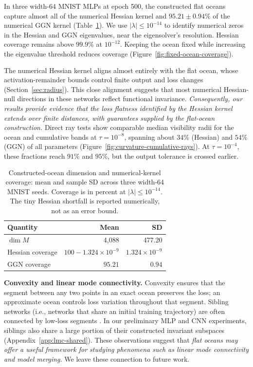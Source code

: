\documentclass[twoside]{article}
\theoremstyle{remark}
\theoremstyle{highlightdefinition}
\theoremstyle{remark}
\begin{document}
In three width-64 MNIST MLPs at epoch 500, the constructed flat oceans capture almost all of the numerical Hessian kernel and $95.21\pm0.94\%$ of the numerical GGN kernel (Table~\ref{tab:exact-kernel-coverage}). We use $|\lambda|\le10^{-14}$ to identify numerical zeros in the Hessian and GGN eigenvalues, near the eigensolver's resolution. Hessian coverage remains above $99.9\%$ at $10^{-12}$. Keeping the ocean fixed while increasing the eigenvalue threshold reduces coverage (Figure~\ref{fig:fixed-ocean-coverage}).

The numerical Hessian kernel aligns almost entirely with the flat ocean, whose activation-remainder bounds control finite output and loss changes (Section~\ref{sec:radius}). This close alignment suggests that most numerical Hessian-null directions in these networks reflect functional invariance. \emph{Consequently, our results provide evidence that the loss flatness identified by the Hessian kernel extends over finite distances, with guarantees supplied by the  flat-ocean construction.} Direct ray tests show comparable median visibility radii for the ocean and cumulative bands at $\tau=10^{-8}$, spanning about $34\%$ (Hessian) and $54\%$ (GGN) of all parameters (Figure~\ref{fig:curvature-cumulative-rays}). At $\tau=10^{-4}$, these fractions reach $91\%$ and $95\%$, but the output tolerance is crossed earlier.

\begin{table}\centering
\caption{Constructed-ocean dimension and numerical-kernel coverage: mean and sample SD across three width-64 MNIST seeds. Coverage is in percent at $|\lambda|\le10^{-14}$. The tiny Hessian shortfall is reported numerically, not as an error bound.}
\label{tab:exact-kernel-coverage}
\small\begin{tabular}{lrr}\toprule
Quantity & Mean & SD\\\midrule
$\dim M$ & 4,088 & 477.20\\
Hessian coverage & $100-1.324\!\times\!10^{-9}$ & $1.324\!\times\!10^{-9}$\\
GGN coverage & $95.21$ & $0.94$\\
\bottomrule\end{tabular}
\end{table}


\textbf{Convexity and linear mode connectivity.}\;\;
Convexity ensures that the segment between any two points in an exact ocean preserves the loss; an approximate ocean controls loss variation throughout that segment. Sibling networks (i.e., networks that share an initial training trajectory) are often connected by low-loss segments \citep{frankle2020linear}. In our preliminary MLP and CNN experiments, siblings also share a large portion of their constructed invariant subspaces (Appendix~\ref{app:lmc-shared}). These observations suggest that \emph{flat oceans may offer a useful framework for studying phenomena such as linear mode connectivity and model merging.} We leave these connection to future work.
\end{document}
